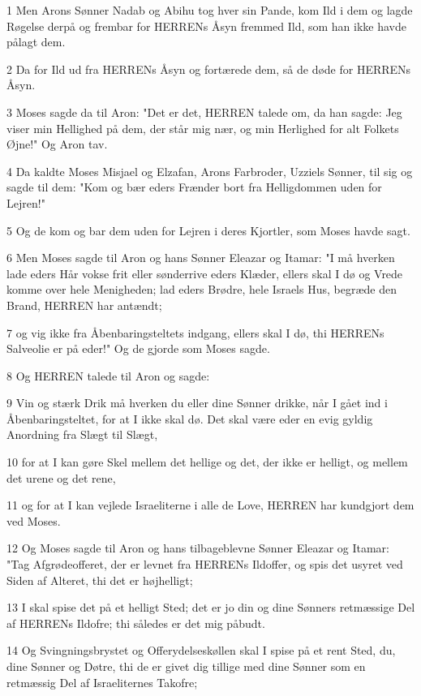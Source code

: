 \par 1 Men Arons Sønner Nadab og Abihu tog hver sin Pande, kom Ild i dem og lagde Røgelse derpå og frembar for HERRENs Åsyn fremmed Ild, som han ikke havde pålagt dem.
\par 2 Da for Ild ud fra HERRENs Åsyn og fortærede dem, så de døde for HERRENs Åsyn.
\par 3 Moses sagde da til Aron: "Det er det, HERREN talede om, da han sagde: Jeg viser min Hellighed på dem, der står mig nær, og min Herlighed for alt Folkets Øjne!" Og Aron tav.
\par 4 Da kaldte Moses Misjael og Elzafan, Arons Farbroder, Uzziels Sønner, til sig og sagde til dem: "Kom og bær eders Frænder bort fra Helligdommen uden for Lejren!"
\par 5 Og de kom og bar dem uden for Lejren i deres Kjortler, som Moses havde sagt.
\par 6 Men Moses sagde til Aron og hans Sønner Eleazar og Itamar: "I må hverken lade eders Hår vokse frit eller sønderrive eders Klæder, ellers skal I dø og Vrede komme over hele Menigheden; lad eders Brødre, hele Israels Hus, begræde den Brand, HERREN har antændt;
\par 7 og vig ikke fra Åbenbaringsteltets indgang, ellers skal I dø, thi HERRENs Salveolie er på eder!" Og de gjorde som Moses sagde.
\par 8 Og HERREN talede til Aron og sagde:
\par 9 Vin og stærk Drik må hverken du eller dine Sønner drikke, når I gået ind i Åbenbaringsteltet, for at I ikke skal dø. Det skal være eder en evig gyldig Anordning fra Slægt til Slægt,
\par 10 for at I kan gøre Skel mellem det hellige og det, der ikke er helligt, og mellem det urene og det rene,
\par 11 og for at I kan vejlede Israeliterne i alle de Love, HERREN har kundgjort dem ved Moses.
\par 12 Og Moses sagde til Aron og hans tilbageblevne Sønner Eleazar og Itamar: "Tag Afgrødeofferet, der er levnet fra HERRENs Ildoffer, og spis det usyret ved Siden af Alteret, thi det er højhelligt;
\par 13 I skal spise det på et helligt Sted; det er jo din og dine Sønners retmæssige Del af HERRENs Ildofre; thi således er det mig påbudt.
\par 14 Og Svingningsbrystet og Offerydelseskøllen skal I spise på et rent Sted, du, dine Sønner og Døtre, thi de er givet dig tillige med dine Sønner som en retmæssig Del af Israeliternes Takofre;
